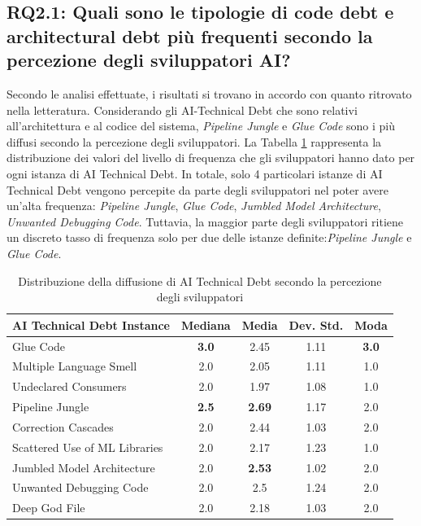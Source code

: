 \subsection{RQ2.1: Quali sono le tipologie di code debt e architectural debt più frequenti secondo la percezione degli sviluppatori AI?}

Secondo le analisi effettuate, i risultati si trovano in accordo con quanto ritrovato nella letteratura.
Considerando gli AI-Technical Debt che sono relativi all'architettura e al codice del sistema, \textit{Pipeline Jungle} e \textit{Glue Code} sono i più diffusi secondo la percezione degli sviluppatori.
La Tabella \ref{tab:freq_index} rappresenta la distribuzione dei valori del livello di frequenza che gli sviluppatori hanno dato per ogni istanza di AI Technical Debt.
In totale, solo 4 particolari istanze di AI Technical Debt vengono percepite da parte degli sviluppatori nel poter avere un'alta frequenza: \textit{Pipeline Jungle}, \textit{Glue Code}, \textit{Jumbled Model Architecture}, \textit{Unwanted Debugging Code}.
Tuttavia, la maggior parte degli sviluppatori ritiene un discreto tasso di frequenza solo per due delle istanze definite:\textit{Pipeline Jungle} e \textit{Glue Code}.

\begin{table}[h]
    \footnotesize
    \centering
    \begin{tabular}{|l|c|c|c|c|}
    \hline
    \textbf{AI Technical Debt Instance} & \textbf{Mediana} & \textbf{Media} & \textbf{Dev. Std.} & \textbf{Moda} \\
    \hline
    Glue Code & \textbf{3.0} & 2.45 & 1.11 & \textbf{3.0} \\
    Multiple Language Smell & 2.0 & 2.05 & 1.11 & 1.0 \\
    Undeclared Consumers & 2.0 & 1.97 & 1.08 & 1.0 \\
    Pipeline Jungle & \textbf{2.5} &\textbf{2.69} & 1.17 & 2.0 \\
    Correction Cascades & 2.0 & 2.44 & 1.03 & 2.0 \\
    Scattered Use of ML Libraries & 2.0 & 2.17 & 1.23 & 1.0 \\
    Jumbled Model Architecture & 2.0 & \textbf{2.53} & 1.02 & 2.0 \\
    Unwanted Debugging Code & 2.0 & 2.5 & 1.24 & 2.0 \\
    Deep God File & 2.0 & 2.18 & 1.03 & 2.0 \\
    \hline
    \end{tabular}
    \caption{Distribuzione della diffusione di AI Technical Debt secondo la percezione degli sviluppatori}
    \label{tab:freq_index}
\end{table}

